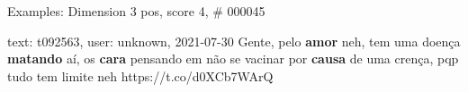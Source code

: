 \begin{frame}{Examples: Dimension 3 pos, score 4, \# 000045}
\footnotesize
\begin{exampleblock}{text: t092563, user: unknown, 2021-07-30}
Gente, pelo \textbf{amor} neh, tem uma doença \textbf{matando} aí, os 
\textbf{cara} pensando em não se vacinar por \textbf{causa} de uma crença, pqp 
tudo tem limite neh https://t.co/d0XCb7WArQ 
\end{exampleblock}
\end{frame}
